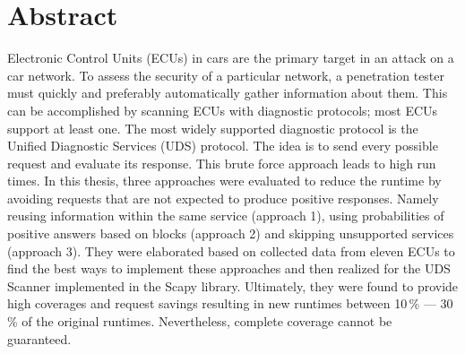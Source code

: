 \chapter*{\centering Abstract}

Electronic Control Units (ECUs) in cars are the primary target in an attack on a car network. To assess the security of a particular network, a penetration tester must quickly and preferably automatically gather information about them. This can be accomplished by scanning ECUs with diagnostic protocols; most ECUs support at least one. The most widely supported diagnostic protocol is the Unified Diagnostic Services (UDS) protocol. The idea is to send every possible request and evaluate its response. This brute force approach leads to high run times. In this thesis, three approaches were evaluated to reduce the runtime by avoiding requests that are not expected to produce positive responses. Namely reusing information within the same service (approach 1), using probabilities of positive answers based on blocks (approach 2) and skipping unsupported services (approach 3). They were elaborated based on collected data from eleven ECUs to find the best ways to implement these approaches and then realized for the UDS Scanner implemented in the Scapy library. Ultimately, they were found to provide high coverages and request savings resulting in new runtimes between 10\,\% — 30\,\% of the original runtimes. Nevertheless, complete coverage cannot be guaranteed.

